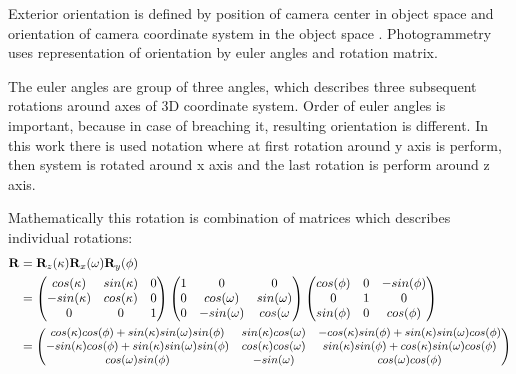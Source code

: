 \documentclass[a4paper,12pt]{report}
\newcommand{\ematr}[1]{
{\bf #1}
}
\newcommand{\escal}[1]{
{\it #1}
}
\begin{document}
Exterior orientation is defined by position of camera center in object space and orientation of camera coordinate system in the object space .
Photogrammetry uses representation of orientation by euler angles and rotation matrix.

The euler angles are group of three angles, which describes three subsequent rotations
 around axes of 3D coordinate system. 
 Order of euler angles is important, because in case of breaching it, resulting orientation is different. 
 In this work there is used notation where at first rotation around y axis is 
 perform, then system is rotated around x axis and the last rotation is perform around z axis.
 
Mathematically this rotation is combination of matrices which describes individual rotations:
 \begin{equation}
 \begin{split}
\ematr{R} &= \ematr{R}_{z}(\escal{\kappa}) \ematr{R}_{x}(\escal{\omega}) \ematr{R}_{y}(\escal{\phi}) \\
	  &= \begin{pmatrix}
	      cos(\escal{\kappa}) & sin(\escal{\kappa}) & 0 \\
	      -sin(\escal{\kappa}) & cos(\escal{\kappa}) & 0 \\
	      0 & 0 & 1
	      \end{pmatrix}
	      \begin{pmatrix}
	      1 & 0 & 0 \\
	      0 & cos(\escal{\omega}) & sin(\escal{\omega}) \\
	      0 & -sin(\escal{\omega}) & cos(\escal{\omega} 
	      \end{pmatrix}
	      \begin{pmatrix}
	      cos(\escal{\phi}) & 0 & -sin(\escal{\phi}) \\
	      0 & 1 & 0 \\
	      sin(\phi) & 0 & cos(\phi)      
	      \end{pmatrix} \\
	  &=  
	      \small
	      \begin{pmatrix}
	      cos(\escal{\kappa}) cos(\escal{\phi}) + sin(\escal{\kappa}) sin(\escal{\omega}) sin(\escal{\phi}) & 
	      sin(\escal{\kappa}) cos(\escal{\omega})  & 
	      -cos(\escal{\kappa}) sin(\escal{\phi}) + sin(\escal{\kappa}) sin(\escal{\omega}) cos(\escal{\phi}) 
	      \\
	      -sin(\escal{\kappa}) cos(\escal{\phi}) + sin(\escal{\kappa}) sin(\escal{\omega}) sin(\escal{\phi}) & 
	      cos(\escal{\kappa}) cos(\escal{\omega})  & 
	      sin(\escal{\kappa}) sin(\escal{\phi}) + cos(\escal{\kappa}) sin(\escal{\omega}) cos(\escal{\phi}) 
	      \\	      
	      cos(\escal{\omega}) sin(\escal{\phi}) & 
	      -sin(\escal{\omega})  & 
	      cos(\escal{\omega}) cos(\escal{\phi}) 
	      \\		      
	      \end{pmatrix} 
\end{split}
\end{equation}
\end{document}
